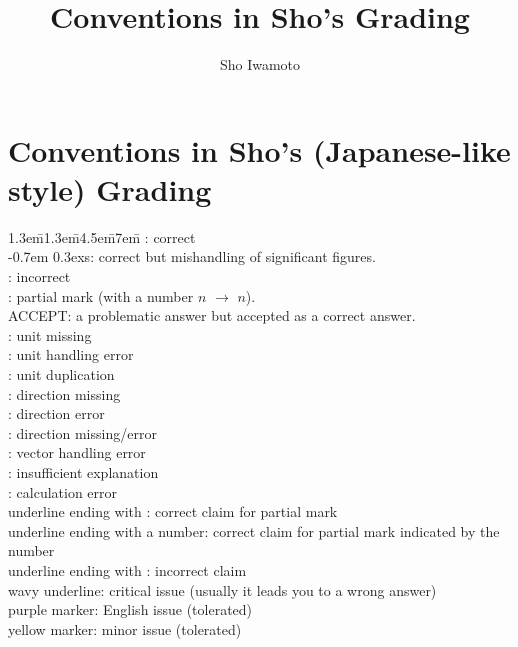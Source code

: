 \documentclass[11pt,pdfa,lastpage]{MishoNote}
\title{Conventions in Sho's Grading}
\author{Sho Iwamoto}
\begin{document}
%
\section*{Conventions in Sho's (Japanese-like style) Grading}


\begin{tabbing}
  \kern1.3em\=\kern1.3em\=\kern4.5em\=\kern7em\=\kill
  \>: correct\\
  \kern-0.7em \raise0.3ex\hbox{\small\textsf s}\>: correct but mishandling of significant figures.\\
  \>: incorrect\\
  \>: partial mark (with a number $n$ $\to$ $n$)\footnotemark.\\[.5em]
  \textsf{ACCEPT}: a problematic answer but accepted as a correct answer.\\[1em]


  \>\>: unit missing\\
  \>\>: unit handling error\\
  \>\>: unit duplication\\
  \>\>: direction missing\\
  \>\>: direction error\\
  \>\>: direction missing/error\\
  \>\>: vector handling error\\
  \>\>: insufficient explanation\\
  \>\>: calculation error\\[1em]

  underline ending with \>\>\>\>: correct claim for partial mark\\
  underline ending with a number\>\>\>\>: correct claim for partial mark indicated by the number\\
  underline ending with \>\>\>\>: incorrect claim\\[1em]

  wavy underline\>\>\>: critical issue (usually it leads you to a wrong answer)\\
  purple marker\>\>\>: English issue (tolerated)\\
  yellow marker\>\>\>: minor issue (tolerated)\\
\end{tabbing}
\end{document}
